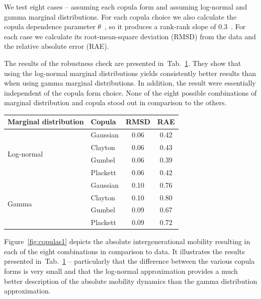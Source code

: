 \documentclass[12pt]{article}
\newcommand{\ra}[1]{\renewcommand{\arraystretch}{#1}}
\newcommand{\Fref}[1]{Figure~\ref{fig:#1}}
\newcommand{\tlabel}[1]{\label{tab:#1}}
\newcommand{\tref}[1]{Tab.~\ref{tab:#1}}
\numberwithin{equation}{section}
\begin{document}
We test eight cases -- assuming each copula form and assuming log-normal and gamma marginal distributions. For each copula choice we also calculate the copula dependence parameter $\theta$~\citep{trivedi2007copula}, so it produces a rank-rank slope of $0.3$~\citep{chetty2014land}. For each case we calculate its root-mean-square deviation (RMSD) from the data and the relative absolute error (RAE).

The results of the robustness check are presented in~\tref{robust}. They show that using the log-normal marginal distributions yields consistently better results than when using gamma marginal distributions. In addition, the result were essentially independent of the copula form choice. None of the eight possible combinations of marginal distribution and copula stood out in comparison to the others.

\begin{table}[!htb]
\ra{1.1}
\centering
{}\tlabel{robust}
\begin{tabular}{@{}llcc@{}}\toprule[1.5pt]
Marginal distribution & Copula & RMSD & RAE\\
\midrule[1.5pt]
\multirow{ 4}{*}{Log-normal}
& Gaussian & 0.06 & 0.42\\
& Clayton & 0.06 & 0.43\\
& Gumbel &  0.06 & 0.39\\
& Plackett & 0.06 & 0.42\\
\midrule[1.5pt]
\multirow{ 4}{*}{Gamma}
& Gaussian  & 0.10 & 0.76\\
& Clayton  & 0.10 & 0.80\\
& Gumbel  & 0.09 & 0.67\\
& Plackett & 0.09 & 0.72\\
\bottomrule[1.5pt]
\end{tabular}
\end{table}

\Fref{copulas1} depicts the absolute intergenerational mobility resulting in each of the eight combinations in comparison to data. It illustrates the results presented in~\tref{robust} -- particularly that the difference between the various copula forms is very small and that the log-normal approximation provides a much better description of the absolute mobility dynamics than the gamma distribution approximation.
\end{document}
